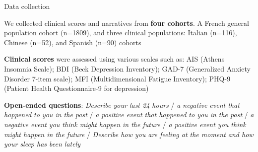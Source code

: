 \documentclass[10pt]{beamer}
\begin{document}
\begin{frame}{Data collection}

We collected clinical scores and narratives from \textbf{four cohorts}. A French general population cohort (n=1809), and three clinical populations: Italian (n=116), Chinese (n=52), and Spanish (n=90) cohorts%

\vspace{0.5cm}
\pause

\textbf{Clinical scores} were assessed using various scales such as: AIS (Athens Insomnia Scale); BDI (Beck Depression Inventory); GAD-7 (Generalized Anxiety Disorder 7-item scale); MFI (Multidimensional Fatigue Inventory); PHQ-9 (Patient Health Questionnaire-9 for depression)

\vspace{0.5cm}
\pause

\textbf{Open-ended questions}: \textit{Describe your last 24 hours} / \textit{a negative event that happened to you in the past} / \textit{a positive event that happened to you in the past} / \textit{a negative event you think might happen in the future} / \textit{a positive event you think might happen in the future} / \textit{Describe how you are feeling at the moment and how your sleep has been lately}

\end{frame}
\end{document}
